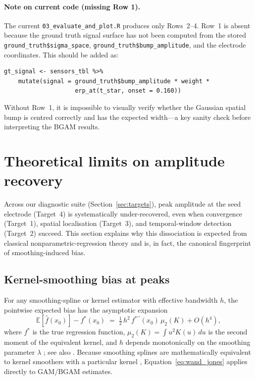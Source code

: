 \documentclass[12pt, a4paper]{article}
\begin{document}
\paragraph{Note on current code (missing Row 1).}
The current \texttt{03\_evaluate\_and\_plot.R} produces only Rows~2--4.
Row~1 is absent because the ground truth signal surface has not been
computed from the stored \texttt{ground\_truth\$sigma\_space},
\texttt{ground\_truth\$bump\_amplitude}, and the electrode coordinates.
This should be added as:
\begin{verbatim}
gt_signal <- sensors_tbl %>%
    mutate(signal = ground_truth$bump_amplitude * weight *
                    erp_at(t_star, onset = 0.160))
\end{verbatim}
Without Row~1, it is impossible to visually verify whether the Gaussian
spatial bump is centred correctly and has the expected width---a key
sanity check before interpreting the BGAM results.

\section{Theoretical limits on amplitude recovery}\label{sec:amp_theory}

Across our diagnostic suite (Section~\ref{sec:targets}), peak amplitude at the
seed electrode (Target~4) is systematically under-recovered, even when
convergence (Target~1), spatial localisation (Target~3), and temporal-window
detection (Target~2) succeed. This section explains why this dissociation is
expected from classical nonparametric-regression theory and is, in fact, the
canonical fingerprint of smoothing-induced bias.

\subsection{Kernel-smoothing bias at peaks}\label{sec:bias_formula}

For any smoothing-spline or kernel estimator with effective bandwidth $h$,
the pointwise expected bias has the asymptotic expansion
\begin{equation}\label{eq:wand_jones}
\mathbb{E}[\hat{f}(x_0)] - f^{*}(x_0)
   \;=\; \tfrac{1}{2}\, h^{2}\, f^{*\prime\prime}(x_0)\, \mu_{2}(K)
        + O(h^{4}),
\end{equation}
where $f^{*}$ is the true regression function, $\mu_{2}(K)=\int u^{2}K(u)\,du$
is the second moment of the equivalent kernel, and $h$ depends monotonically
on the smoothing parameter $\lambda$ \citep[\S 4.3]{WandJones1995}; see also
\citet[\S 3.1]{FanGijbels1996}. Because smoothing splines are mathematically
equivalent to kernel smoothers with a particular kernel \citep{Eubank1988,
GreenSilverman1994}, Equation~\eqref{eq:wand_jones} applies directly to
GAM/BGAM estimates.
\end{document}
